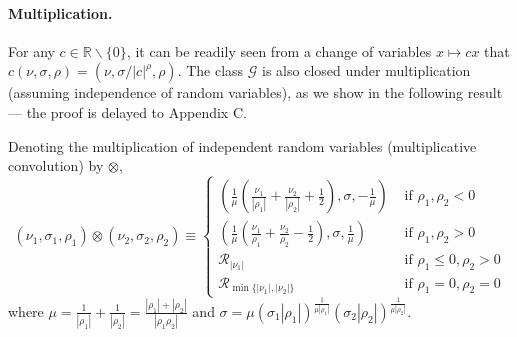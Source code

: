 \documentclass[../thesis.tex]{subfiles}
\begin{document}
\paragraph{Multiplication.}
For any $c \in \mathbb{R} \backslash \{0\}$, it can be readily seen from a change of variables $x \mapsto c x$ that $c (\nu, \sigma, \rho) = (\nu, \sigma / |c|^\rho, \rho)$. The class $\mathcal{G}$ is also closed under multiplication (assuming independence of random variables), as we show in the following result --- the proof is delayed to Appendix C.
\begin{proposition}
  \label{prop:Mult}
  Denoting the multiplication of independent random variables (multiplicative convolution) by $\otimes$,
  \[
    (\nu_{1},\sigma_{1},\rho_{1})\otimes(\nu_{2},\sigma_{2},\rho_{2})
    \equiv\begin{cases}
      \left(\frac{1}{\mu}\left(\frac{\nu_{1}}{|\rho_{1}|}+\frac{\nu_{2}}{|\rho_{2}|}+\frac{1}{2}\right),\sigma,-\frac{1}{\mu}\right) & \text{ if }\rho_{1},\rho_{2}<0      \\
      \left(\frac{1}{\mu}\left(\frac{\nu_{1}}{\rho_{1}}+\frac{\nu_{2}}{\rho_{2}}-\frac{1}{2}\right),\sigma,\frac{1}{\mu}\right)      & \text{ if }\rho_{1},\rho_{2}>0      \\
      \mathcal{R}_{|\nu_1|}                                                                                                          & \mbox{ if }\rho_{1}\leq0,\rho_{2}>0 \\
      \mathcal{R}_{\min\{|\nu_1|,|\nu_2|\}}                                                                                          & \mbox{ if }\rho_{1}=0,\rho_{2}=0
    \end{cases}
  \]
  where $\mu=\frac{1}{|\rho_{1}|}+\frac{1}{|\rho_{2}|}=\frac{|\rho_{1}|+|\rho_{2}|}{|\rho_{1}\rho_{2}|}$ and $\sigma=\mu(\sigma_{1}|\rho_{1}|)^{\frac{1}{\mu|\rho_{1}|}}(\sigma_{2}|\rho_{2}|)^{\frac{1}{\mu|\rho_{2}|}}$.
\end{proposition}

\end{document}
